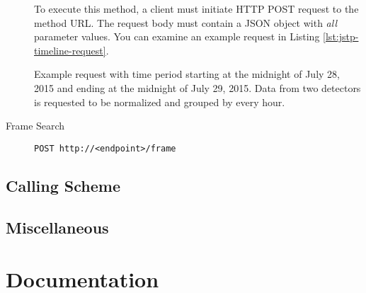 \begin{description}
	To execute this method, a client must initiate HTTP POST request to the method URL. The request body must contain a JSON object with \textit{all} parameter values. You can examine an example request in Listing \ref{lst:jstp-timeline-request}.

	\begin{listing}
	    \caption{Example request with time period starting at the midnight of July 28, 2015 and ending at the midnight of July 29, 2015. Data from two detectors is requested to be normalized and grouped by every hour.}
	    \label{lst:jstp-timeline-request}
	\end{listing}



	\item[Frame Search]
	\texttt{POST http://<endpoint>/frame}
\end{description}

\subsection{Calling Scheme}

\subsection{Miscellaneous}

\section{Documentation}

